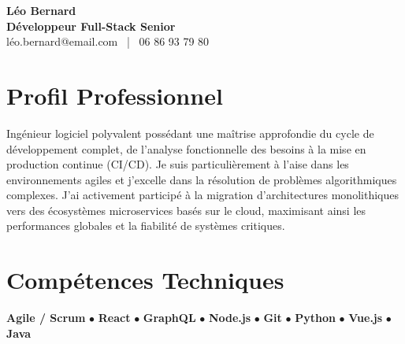 \documentclass[11pt,a4paper]{article}
\begin{document}
\begin{center}
    {\Huge \textbf{Léo Bernard}} \\[0.2cm]
    {\Large \textbf{Développeur Full-Stack Senior}} \\[0.1cm]
    léo.bernard@email.com \ | \ 06 86 93 79 80
\end{center}

\vspace{0.3cm}

\section*{Profil Professionnel}
\noindent
Ingénieur logiciel polyvalent possédant une maîtrise approfondie du cycle de développement complet, de l'analyse fonctionnelle des besoins à la mise en production continue (CI/CD). Je suis particulièrement à l'aise dans les environnements agiles et j'excelle dans la résolution de problèmes algorithmiques complexes. J'ai activement participé à la migration d'architectures monolithiques vers des écosystèmes microservices basés sur le cloud, maximisant ainsi les performances globales et la fiabilité de systèmes critiques.

\vspace{0.3cm}

\section*{Compétences Techniques}
\noindent
\textbf{Agile / Scrum} $\bullet$ \textbf{React} $\bullet$ \textbf{GraphQL} $\bullet$ \textbf{Node.js} $\bullet$ \textbf{Git} $\bullet$ \textbf{Python} $\bullet$ \textbf{Vue.js} $\bullet$ \textbf{Java}

\vspace{0.3cm}

\end{document}
